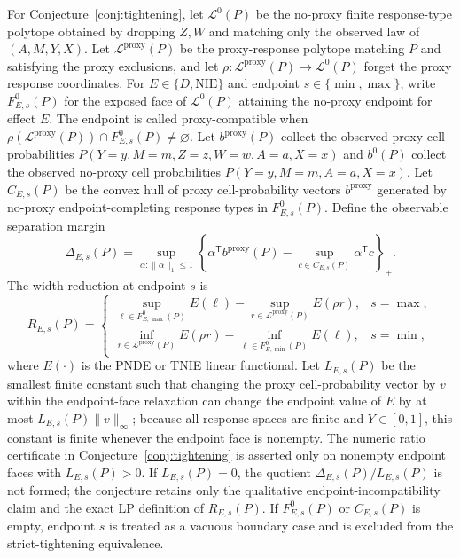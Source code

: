 \documentclass[11pt]{article}
\newcommand{\transpose}{\mathsf{T}}
\theoremstyle{definition}
\theoremstyle{plain}
\theoremstyle{remark}
\begin{document}
For Conjecture~\ref{conj:tightening}, let \(\mathcal L^0(P)\) be the no-proxy finite response-type polytope obtained by dropping \(Z,W\) and matching only the observed law of \((A,M,Y,X)\).  Let \(\mathcal L^{\mathrm{proxy}}(P)\) be the proxy-response polytope matching \(P\) and satisfying the proxy exclusions, and let \(\rho:\mathcal L^{\mathrm{proxy}}(P)\to\mathcal L^0(P)\) forget the proxy response coordinates.  For \(E\in\{D,\mathrm{NIE}\}\) and endpoint \(s\in\{\min,\max\}\), write \(F^0_{E,s}(P)\) for the exposed face of \(\mathcal L^0(P)\) attaining the no-proxy endpoint for effect \(E\).  The endpoint is called proxy-compatible when \(\rho(\mathcal L^{\mathrm{proxy}}(P))\cap F^0_{E,s}(P)\neq\varnothing\).
Let \(b^{\mathrm{proxy}}(P)\) collect the observed proxy cell probabilities \(P(Y=y,M=m,Z=z,W=w,A=a,X=x)\) and \(b^0(P)\) collect the observed no-proxy cell probabilities \(P(Y=y,M=m,A=a,X=x)\).  Let \(C_{E,s}(P)\) be the convex hull of proxy cell-probability vectors \(b^{\mathrm{proxy}}\) generated by no-proxy endpoint-completing response types in \(F^0_{E,s}(P)\).  Define the observable separation margin
\[
\Delta_{E,s}(P)=\sup_{\alpha:\|\alpha\|_1\le1}
\left\{\alpha^\transpose b^{\mathrm{proxy}}(P)-
\sup_{c\in C_{E,s}(P)}\alpha^\transpose c\right\}_+.
\]
The width reduction at endpoint \(s\) is
\[
R_{E,s}(P)=
\begin{cases}
\sup_{\ell\in F^0_{E,\max}(P)}E(\ell)-\sup_{r\in\mathcal L^{\mathrm{proxy}}(P)}E(\rho r),&s=\max,\\
\inf_{r\in\mathcal L^{\mathrm{proxy}}(P)}E(\rho r)-\inf_{\ell\in F^0_{E,\min}(P)}E(\ell),&s=\min,
\end{cases}
\]
where \(E(\cdot)\) is the PNDE or TNIE linear functional.
Let \(L_{E,s}(P)\) be the smallest finite constant such that changing the proxy cell-probability vector by \(v\) within the endpoint-face relaxation can change the endpoint value of \(E\) by at most \(L_{E,s}(P)\|v\|_\infty\); because all response spaces are finite and \(Y\in[0,1]\), this constant is finite whenever the endpoint face is nonempty.  The numeric ratio certificate in Conjecture~\ref{conj:tightening} is asserted only on nonempty endpoint faces with \(L_{E,s}(P)>0\).  If \(L_{E,s}(P)=0\), the quotient \(\Delta_{E,s}(P)/L_{E,s}(P)\) is not formed; the conjecture retains only the qualitative endpoint-incompatibility claim and the exact LP definition of \(R_{E,s}(P)\).  If \(F^0_{E,s}(P)\) or \(C_{E,s}(P)\) is empty, endpoint \(s\) is treated as a vacuous boundary case and is excluded from the strict-tightening equivalence.
\end{document}
